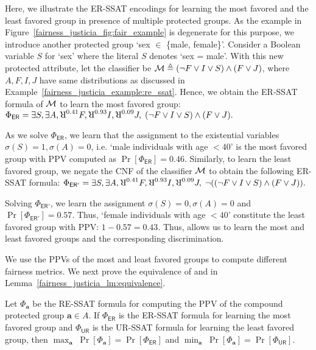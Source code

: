 \begin{example}
	\label{fairness_justicia_example:er_ssat}
	Here, we illustrate the ER-SSAT encodings for learning the most favored and the least favored group in presence of multiple protected groups. As the example in Figure~\ref{fairness_justicia_fig:fair_example} is degenerate for this purpose, we introduce another protected group `sex $ \in $ \{male, female\}'. Consider a Boolean variable $ S $ for `sex' where the literal $ S $ denotes `sex = male'. With this new protected attribute, let the classifier be  $\mathcal{M} \triangleq (\neg F \vee I \vee S) \wedge (F \vee J)$, where $ A,F,I,J $ have same distributions as discussed in Example~\ref{fairness_justicia_example:re_ssat}. 
	Hence, we obtain the ER-SSAT formula of $\mathcal{M}$ to learn the most favored group:
	$ \Phi_{\mathsf{ER}} =  \exists S,\exists A, \R^{0.41}F, \R^{0.93}I, \R^{0.09}J, \; (\neg F \vee I \vee S) \wedge (F \vee J).
	$
	
	As we solve $ \Phi_{\mathsf{ER}} $, we learn that the assignment to the existential variables $ \sigma(S) = 1, \sigma(A) = 0$, i.e. `male individuals with age $ < 40 $' is the most favored group with PPV computed as $ \Pr[\Phi_{\mathsf{ER}}] = 0.46$. Similarly, to learn the least favored group, we negate the CNF of the classifier $\mathcal{M}$ to obtain the following ER-SSAT formula:
	$	\Phi_{\mathsf{ER'}} =  \exists S, \exists A, \R^{0.41}F, \R^{0.93}I, \R^{0.09}J, \; \neg((\neg F \vee I \vee S) \wedge (F \vee J)).
	$
	
	Solving $ \Phi_{\mathsf{ER'}} $, we learn the assignment $ \sigma(S) = 0, \sigma(A) = 0  $ and $  \Pr[\Phi_{\mathsf{ER'}}] = 0.57 $. Thus, `female individuals with age $ < 40 $' constitute the least favored group with PPV:  $ 1-0.57 = 0.43$. 
	Thus, {\justicialearn} allows us to learn the most and least favored groups and the corresponding discrimination.
\end{example}
We use the PPVs of the most and least favored groups to compute different fairness metrics. We next prove the equivalence of {\justiciaenum} and {\justicialearn} in Lemma~\ref{fairness_justicia_lm:equivalence}.
\begin{lemma}
	\label{fairness_justicia_lm:equivalence}
	Let $ \Phi_{\mathbf{a}} $ be the RE-SSAT formula for computing the PPV of the compound protected group $ \mathbf{a} \in A $. If $ \Phi_{\mathsf{ER}} $ is the ER-SSAT formula for learning the most favored group and $ \Phi_{\mathsf{UR}} $ is the UR-SSAT formula for learning the least favored group, then
	$\max_{\mathbf{a}} \; \Pr[\Phi_{\mathbf{a}}] = \Pr[\Phi_{\mathsf{ER}}]$   
	and
	$\min_{\mathbf{a}} \; \Pr[\Phi_{\mathbf{a}}] = \Pr[\Phi_{\mathsf{UR}}]$.   
\end{lemma}
